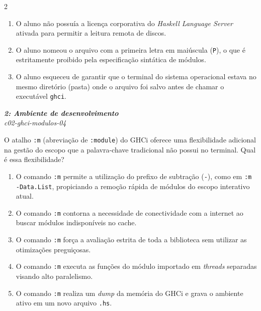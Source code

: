 \documentclass[a4paper,10pt,brazil]{article}
\begin{document}
\begin{multicols}{2}
\begin{enumerate}
  \item O aluno não possuía a licença corporativa do \emph{Haskell Language Server} ativada para permitir a leitura remota de discos.

  \item O aluno nomeou o arquivo com a primeira letra em maiúscula (\texttt{P}), o que é estritamente proibido pela especificação sintática de módulos.

  \item O aluno esqueceu de garantir que o terminal do sistema operacional estava no mesmo diretório (pasta) onde o arquivo foi salvo antes de chamar o executável \texttt{ghci}.


\end{enumerate}

\begin{flushright}
  \footnotesize
  \textit{\textbf{2: Ambiente de desenvolvimento}}\\
  \textit{c02-ghci-modulos-04}\\

\end{flushright}
O atalho \texttt{:m} (abreviação de \texttt{:module}) do GHCi oferece uma flexibilidade adicional na gestão do escopo que a palavra-chave tradicional  não possui no terminal. Qual é essa flexibilidade?

\begin{enumerate}
  \item O comando \texttt{:m} permite a utilização do prefixo de subtração (\texttt{-}), como em \texttt{:m -Data.List}, propiciando a remoção rápida de módulos do escopo interativo atual.

  \item O comando \texttt{:m} contorna a necessidade de conectividade com a internet ao buscar módulos indisponíveis no cache.

  \item O comando \texttt{:m} força a avaliação estrita de toda a biblioteca sem utilizar as otimizações preguiçosas.

  \item O comando \texttt{:m} executa as funções do módulo importado em \emph{threads} separadas visando alto paralelismo.

  \item O comando \texttt{:m} realiza um \emph{dump} da memória do GHCi e grava o ambiente ativo em um novo arquivo \texttt{.hs}.



\end{enumerate}
\end{multicols}
\end{document}
